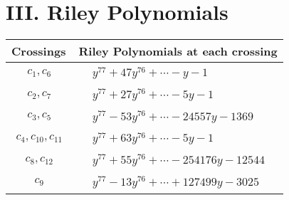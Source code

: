 \documentclass[1p]{elsarticle_modified}
\theoremstyle{definition}
\begin{document}
\centering \section*{ III. Riley Polynomials}
\begin{tabular}{m{50pt}|m{274pt}}
Crossings & \hspace{64pt}Riley Polynomials at each crossing \\
\hline $$\begin{aligned}c_{1},c_{6}\end{aligned}$$&$\begin{aligned}
&y^{77}+47 y^{76}+\cdots- y-1
\end{aligned}$\\
\hline $$\begin{aligned}c_{2},c_{7}\end{aligned}$$&$\begin{aligned}
&y^{77}+27 y^{76}+\cdots-5 y-1
\end{aligned}$\\
\hline $$\begin{aligned}c_{3},c_{5}\end{aligned}$$&$\begin{aligned}
&y^{77}-53 y^{76}+\cdots-24557 y-1369
\end{aligned}$\\
\hline $$\begin{aligned}c_{4},c_{10},c_{11}\end{aligned}$$&$\begin{aligned}
&y^{77}+63 y^{76}+\cdots-5 y-1
\end{aligned}$\\
\hline $$\begin{aligned}c_{8},c_{12}\end{aligned}$$&$\begin{aligned}
&y^{77}+55 y^{76}+\cdots-254176 y-12544
\end{aligned}$\\
\hline $$\begin{aligned}c_{9}\end{aligned}$$&$\begin{aligned}
&y^{77}-13 y^{76}+\cdots+127499 y-3025
\end{aligned}$\\
\hline
\end{tabular}
\vskip 2pc
\end{document}

